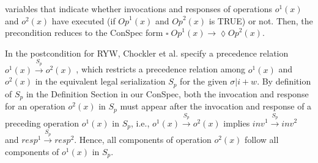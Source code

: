 \documentclass[journal,compsoc]{IEEEtran}
\begin{document}
  variables that indicate whether invocations and responses of operations $\mathit{o}^1(x)$ and $\mathit{o}^2(x)$  have
  executed (if $\mathit{Op}^1(x)$ and $\mathit{Op}^2(x)$ is TRUE) or not.  Then, the precondition reduces to
    the ConSpec form $ \square\; \mathit{Op}^1(x) \rightarrow \lozenge  \mathit{Op}^2(x) $. %
 \par In the postcondition for RYW, Chockler et al.  specify a precedence relation $\mathit{o}^1(x) \xrightarrow{S_p} \mathit{o}^2(x)$ , which  restricts a precedence relation among $\mathit{o}^1(x)$ and $\mathit{o}^2(x)$ in the equivalent legal serialization ${S_p}$ for the given $\sigma |i + w$.   By definition of $S_p$ in the Definition Section in our ConSpec, %
  both the invocation and response for  an operation $\mathit{o}^2(x)$ in $S_p$ must appear after the invocation and response of a preceding operation $\mathit{o}^1(x)$ in $S_p$, i.e., $ \mathit{o}^1(x) \xrightarrow{S_p} \mathit{o}^2(x) $ implies $ \mathit{inv}^1 \xrightarrow{S_p} \mathit{inv}^2 $ and $ \mathit{resp}^1 \xrightarrow{S_p} \mathit{resp}^2 $.
    Hence, all components of operation $\mathit{o}^2(x)$ follow all components of $\mathit{o}^1(x)$ in $S_p$.
\end{document}
